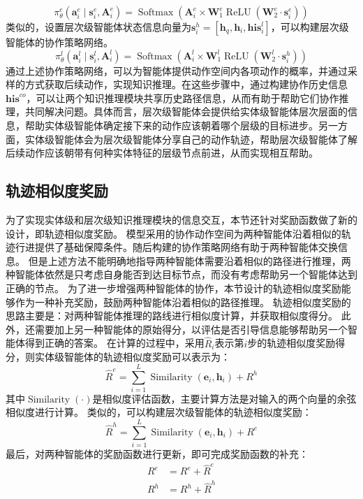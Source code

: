 \documentclass[algorithmlist, AutoFakeBold, AutoFakeSlant, figurelist, tablelist, nomlist, engineering]{seuthesix}
\begin{document}
\begin{equation}
  \pi_\theta^e\left(\bm{a}_i^e \mid \bm{s}_i^e, \bm{A}_i^e\right) =\operatorname{Softmax}\left(\bm{A}_i^e \times \mathbf{W}_1^e \operatorname{ReLU}\left(\mathbf{W}_2^e \cdot \bm{s}_i^{e}\right)\right)
  \label{pi_1}
\end{equation}
类似的，设置层次级智能体状态信息向量为$\bm{s}_i^{h} = \left[\bm{h}_q, \bm{h}_i, \bm{his}_i^l\right]$，可以构建层次级智能体的协作策略网络。
\begin{equation}
  \pi_\theta^l\left(\bm{a}_i^l \mid \bm{s}_i^l, \bm{A}_i^l\right) =\operatorname{Softmax}\left(\bm{A}_i^l \times \mathbf{W}_1^l \operatorname{ReLU}\left(\mathbf{W}_2^l \cdot \bm{s}_i^{h}\right)\right)
  \label{pi_2}
\end{equation}
通过上述协作策略网络，可以为智能体提供动作空间内各项动作的概率，并通过采样的方式获取后续动作，实现知识推理。在这些步骤中，通过构建协作历史信息$\bm{his}^{co}$，可以让两个知识推理模块共享历史路径信息，从而有助于帮助它们协作推理，共同解决问题。具体而言，层次级智能体会提供给实体级智能体层次层面的信息，帮助实体级智能体确定接下来的动作应该朝着哪个层级的目标进步。另一方面，实体级智能体会为层次级智能体分享自己的动作轨迹，帮助层次级智能体了解后续动作应该朝带有何种实体特征的层级节点前进，从而实现相互帮助。

\subsection{轨迹相似度奖励}
为了实现实体级和层次级知识推理模块的信息交互，本节还针对奖励函数做了新的设计，即轨迹相似度奖励。
模型采用的协作动作空间为两种智能体沿着相似的轨迹行进提供了基础保障条件。随后构建的协作策略网络有助于两种智能体交换信息。
但是上述方法不能明确地指导两种智能体需要沿着相似的路径进行推理，两种智能体依然是只考虑自身能否到达目标节点，而没有考虑帮助另一个智能体达到正确的节点。
为了进一步增强两种智能体的协作，本节设计的轨迹相似度奖励能够作为一种补充奖励，鼓励两种智能体沿着相似的路径推理。
轨迹相似度奖励的思路主要是：对两种智能体推理的路线进行相似度计算，并获取相似度得分。
此外，还需要加上另一种智能体的原始得分，以评估是否引导信息能够帮助另一个智能体得到正确的答案。
在计算的过程中，采用$\hat{R}_i$表示第$i$步的轨迹相似度奖励得分，则实体级智能体的轨迹相似度奖励可以表示为：
\begin{equation}
  \hat{R}^e = \sum_{i=1}^{L} \operatorname{Similarity}(\bm{e}_i, \bm{h}_i) + R^h
  \label{similar_1}
\end{equation}
其中$\operatorname{Similarity}(\cdot)$是相似度评估函数，主要计算方法是对输入的两个向量的余弦相似度进行计算。
类似的，可以构建层次级智能体的轨迹相似度奖励：
\begin{equation}
  \hat{R}^h = \sum_{i=1}^{L} \operatorname{Similarity}(\bm{e}_i, \bm{h}_i) + R^e
  \label{similar_2}
\end{equation}
最后，对两种智能体的奖励函数进行更新，即可完成奖励函数的补充：
\begin{equation}
  \begin{aligned}
    R^e &= R^e + \hat{R}^e \\
    R^h &= R^h + \hat{R}^h
  \end{aligned}
  \label{similar_reward}
\end{equation}
\end{document}
